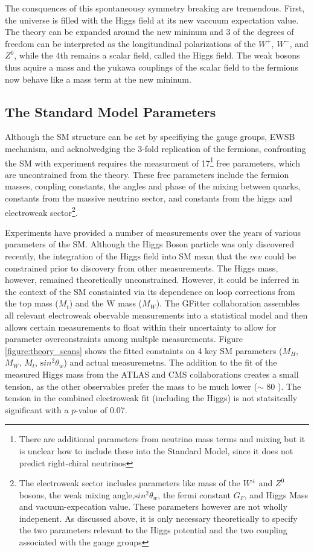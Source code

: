The consquences of this spontaneousy symmetry breaking are tremendous. First,
the universe is filled with the Higgs field at its new vaccuum expectation
value. The theory can be expanded around the new mininum and 3 of the
degrees of freedom can be interpreted as the longitundinal polarizations of
the $W^+$, $W^-$, and $Z^0$, while the 4th remains a scalar field, called
the Higgs field. The weak bosons thus aquire a mass and the yukawa
couplings of the scalar field to the fermions now behave like a mass term
at the new mininum. 


\subsection{The Standard Model Parameters}

Although the SM structure can be set by specifiying the gauge groups, EWSB
mechanism, and acknolwedging the 3-fold replication of the fermions,
confronting the SM with experiment requires the measurment of
17\footnote{There are additional parameters from neutrino mass terms and
mixing but it is unclear how to include these into the Standard Model,
since it does not predict right-chiral neutrinos} free parameters, which
are uncontrained from the theory. These free parameters include the fermion
masses, coupling constants, the angles and phase of the mixing between
quarks, constants from the massive neutrino sector, and constants from the
higgs and electroweak sector\footnote{ The electroweak sector includes
parameters like mass of the $W^{\pm}$ and $Z^0$ bosons, the weak mixing
angle,${\mathrm sin^2}\theta_w$, the fermi constant $G_F$, and Higgs
Mass and vacuum-expecation value. These parameters however are not
wholly indepenent. As discussed above, it is only necessary
theoretically to specify the two parameters relevant to the Higgs
potential and the two coupling associated with the gauge groups }.

Experiments have provided a number of measurements over the years of various
parameters of the SM. Although the Higgs Boson particle was only discovered recently,
the integration of the Higgs field into SM mean that the $vev$ could
be constrained prior to discovery from other measurements. The Higgs mass,
however, remained theoretically unconstrained. 
However, it could be inferred in the context of the SM
constainted via its dependence on loop corrections from the top mass
($M_t$) and the W mass ($M_W$). The GFitter collaboration assembles
all relevant electroweak obervable measurements into a statistical
model and then allows certain measurements to float within their
uncertainty to allow for parameter overconstraints among multple
measurements. Figure \ref{figure:theory_scans} shows the fitted constaints on 4 key SM
parameters ($M_H$, $M_W$, $M_t$, ${\mathrm sin^2}\theta_w$) and
actual measuremetns. The addition to the fit of the measured
Higgs mass from the ATLAS and CMS collaborations creates a small
tension, as the other observables prefer the mass to be much
lower ($\sim$ 80 \gevcc). The tension in the combined
electroweak fit (including the Higgs) is not statsitcally
significant with a $p$-value of 0.07.  


